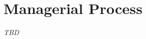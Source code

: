 \documentclass[11pt]{article}
\begin{document}
\section{Managerial Process}
\textit{TBD}
\end{document}
